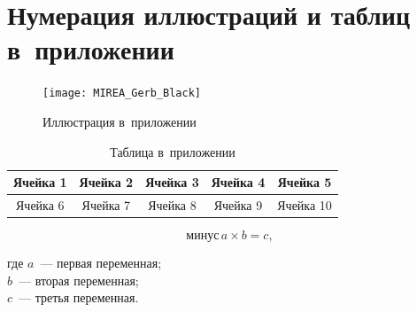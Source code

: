 \documentclass{SIBGU-state}
\begin{document}
\section{Нумерация иллюстраций и таблиц в~приложении}
\label{appendix:fig_tab_eq_numeration}

\begin{figure}[htb]
	\centering
	\texttt{[image: MIREA\_Gerb\_Black]}
	\parskip=6pt
	\caption{Иллюстрация в~приложении}
	\label{fig:in_appendix}
\end{figure}

\begin{table}[htb]
	\caption{Таблица в~приложении}
	\centering
	\begin{tabular}{ |c|c|c|c|c| } 
		\hline
		Ячейка 1 & Ячейка 2 & Ячейка 3 & Ячейка 4 & Ячейка 5 \\ \hline
		Ячейка 6 & Ячейка 7 & Ячейка 8 & Ячейка 9 & Ячейка 10 \\ \hline
	\end{tabular}
	\label{tab:in_appendix}
\end{table}

\begin{equation}\label{eq:in_appendix}
	\text{минус}\,a\times b=c ,
\end{equation}

где $a$~--- первая переменная; \\
$b$~--- вторая переменная; \\
$c$~--- третья переменная.
\end{document}
